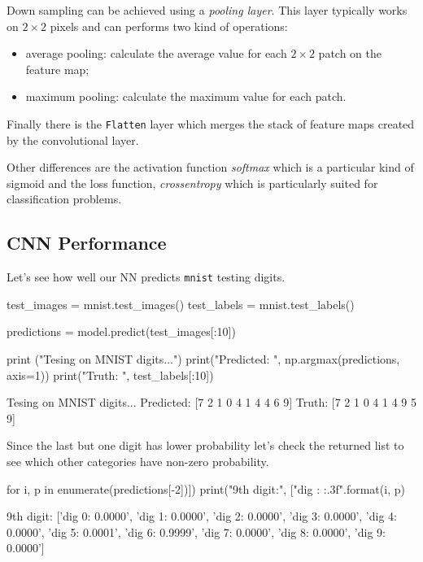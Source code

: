 \begin{attention}
Down sampling can be achieved using a \emph{pooling layer}. This layer typically works on $2\times 2$ pixels and can performs two kind of operations:
\begin{itemize}
\tightlist
\item average pooling: calculate the average value for each $2\times 2$ patch on the feature map;
\item maximum pooling: calculate the maximum value for each patch.
\end{itemize}

Finally there is the \texttt{Flatten} layer which merges the stack of feature maps created by the convolutional layer.

Other differences are the activation function \emph{softmax} which is a particular kind of sigmoid and the loss function, \emph{crossentropy} which is particularly suited for classification problems.
\end{attention}

\subsection{CNN Performance}
Let's see how well our NN predicts \texttt{mnist} testing digits.

\begin{ipython}
test_images = mnist.test_images()
test_labels = mnist.test_labels()

predictions = model.predict(test_images[:10])

print ("Tesing on MNIST digits...")
print("Predicted: ", np.argmax(predictions, axis=1)) 
print("Truth:     ", test_labels[:10])
\end{ipython}
\begin{ioutput}
Tesing on MNIST digits...
Predicted:  [7 2 1 0 4 1 4 4 6 9]
Truth: [7 2 1 0 4 1 4 9 5 9]
\end{ioutput}

Since the last but one digit has lower probability let's check the returned list to see which other categories have non-zero probability.

\begin{ipython}
for i, p in enumerate(predictions[-2])])
    print("9th digit:", ["dig {}: {:.3f}".format(i, p)
\end{ipython}
\begin{ioutput}
9th digit: ['dig 0: 0.0000', 'dig 1: 0.0000', 'dig 2: 0.0000', 'dig 3: 0.0000', 
            'dig 4: 0.0000', 'dig 5: 0.0001', 'dig 6: 0.9999', 'dig 7: 0.0000', 
            'dig 8: 0.0000', 'dig 9: 0.0000']
\end{ioutput}

